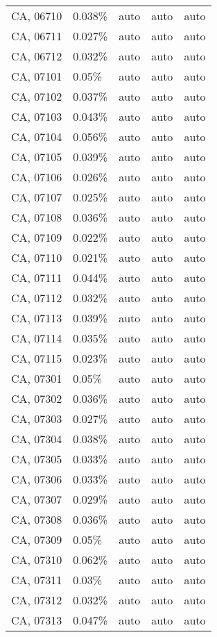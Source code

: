 \begin{longtable}[]{@{}lllll@{}}
CA, 06710 & 0.038\% & auto & auto & auto \\
CA, 06711 & 0.027\% & auto & auto & auto \\
CA, 06712 & 0.032\% & auto & auto & auto \\
CA, 07101 & 0.05\% & auto & auto & auto \\
CA, 07102 & 0.037\% & auto & auto & auto \\
CA, 07103 & 0.043\% & auto & auto & auto \\
CA, 07104 & 0.056\% & auto & auto & auto \\
CA, 07105 & 0.039\% & auto & auto & auto \\
CA, 07106 & 0.026\% & auto & auto & auto \\
CA, 07107 & 0.025\% & auto & auto & auto \\
CA, 07108 & 0.036\% & auto & auto & auto \\
CA, 07109 & 0.022\% & auto & auto & auto \\
CA, 07110 & 0.021\% & auto & auto & auto \\
CA, 07111 & 0.044\% & auto & auto & auto \\
CA, 07112 & 0.032\% & auto & auto & auto \\
CA, 07113 & 0.039\% & auto & auto & auto \\
CA, 07114 & 0.035\% & auto & auto & auto \\
CA, 07115 & 0.023\% & auto & auto & auto \\
CA, 07301 & 0.05\% & auto & auto & auto \\
CA, 07302 & 0.036\% & auto & auto & auto \\
CA, 07303 & 0.027\% & auto & auto & auto \\
CA, 07304 & 0.038\% & auto & auto & auto \\
CA, 07305 & 0.033\% & auto & auto & auto \\
CA, 07306 & 0.033\% & auto & auto & auto \\
CA, 07307 & 0.029\% & auto & auto & auto \\
CA, 07308 & 0.036\% & auto & auto & auto \\
CA, 07309 & 0.05\% & auto & auto & auto \\
CA, 07310 & 0.062\% & auto & auto & auto \\
CA, 07311 & 0.03\% & auto & auto & auto \\
CA, 07312 & 0.032\% & auto & auto & auto \\
CA, 07313 & 0.047\% & auto & auto & auto \\

\end{longtable}
